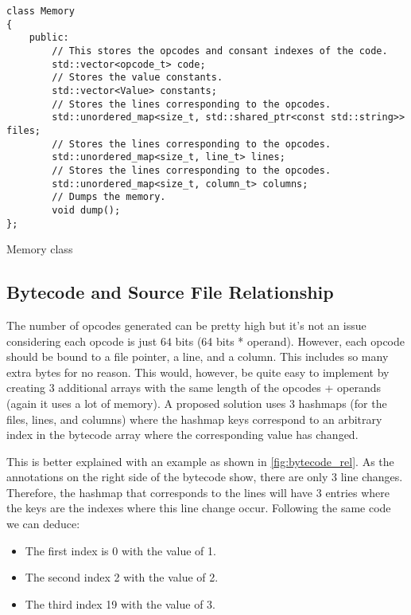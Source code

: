 \begin{listing}[H]
\begin{verbatim}
class Memory
{
    public:
        // This stores the opcodes and consant indexes of the code.
        std::vector<opcode_t> code;
        // Stores the value constants.
        std::vector<Value> constants;
        // Stores the lines corresponding to the opcodes.
        std::unordered_map<size_t, std::shared_ptr<const std::string>> files;
        // Stores the lines corresponding to the opcodes.
        std::unordered_map<size_t, line_t> lines;
        // Stores the lines corresponding to the opcodes.
        std::unordered_map<size_t, column_t> columns;
        // Dumps the memory.
        void dump();
};
\end{verbatim}
\caption{Memory class}
\label{ls:memory_class}
\end{listing}

\subsection{Bytecode and Source File Relationship}
\label{sec:bytecode_origin}

The number of opcodes generated can be pretty high but it's not an issue considering each opcode is just $64$ bits (64 bits * operand).
However, each opcode should be bound to a file pointer, a line, and a column. This includes so many extra bytes for no reason. This would, however, be quite
easy to implement by creating 3 additional arrays with the same length of the opcodes + operands (again it uses a lot of memory). A proposed solution uses 3
hashmaps (for the files, lines, and columns) where the hashmap keys correspond to an arbitrary index in the bytecode array where the corresponding
value has changed.

This is better explained with an example as shown in \autoref{fig:bytecode_rel}. As the annotations on the right side of the bytecode show, there are only 3 line changes. Therefore, the hashmap that corresponds to the lines will have 3 entries where the keys are
the indexes where this line change occur. Following the same code we can deduce:

\begin{itemize}
    \item The first index is 0 with the value of 1.
    \item The second index 2 with the value of 2.
    \item The third index 19 with the value of 3.
\end{itemize}

